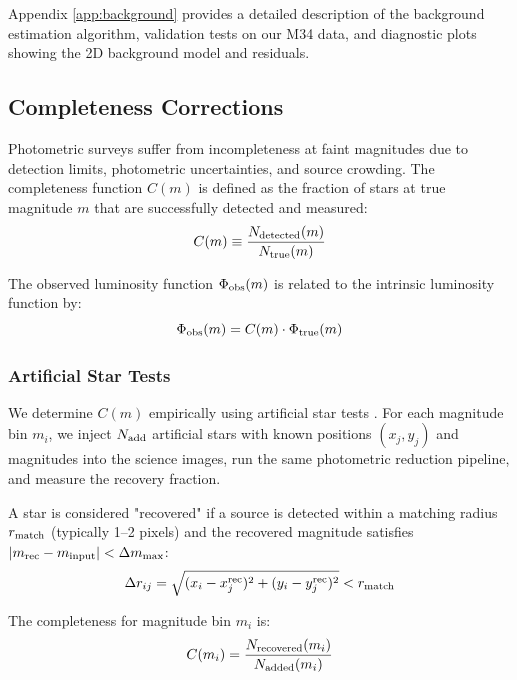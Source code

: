 \documentclass[linenumbers,trackchanges,twocolumn]{aastex701}
\begin{document}
Appendix \ref{app:background} provides a detailed description of the background estimation algorithm, validation tests on our M34 data, and diagnostic plots showing the 2D background model and residuals.

\subsection{Completeness Corrections} \label{subsec:completeness}

Photometric surveys suffer from incompleteness at faint magnitudes due to detection limits, photometric uncertainties, and source crowding. The completeness function $C(m)$ is defined as the fraction of stars at true magnitude $m$ that are successfully detected and measured:
\begin{equation}
C(m) \equiv \frac{N_{\rm detected}(m)}{N_{\rm true}(m)}
\end{equation}

The observed luminosity function $\Phi_{\rm obs}(m)$ is related to the intrinsic luminosity function by:
\begin{equation}
\Phi_{\rm obs}(m) = C(m) \cdot \Phi_{\rm true}(m)
\label{eq:lf_completeness}
\end{equation}

\subsubsection{Artificial Star Tests}

We determine $C(m)$ empirically using artificial star tests \citep{stetson1990}. For each magnitude bin $m_i$, we inject $N_{\rm add}$ artificial stars with known positions $(x_j, y_j)$ and magnitudes into the science images, run the same photometric reduction pipeline, and measure the recovery fraction.

A star is considered "recovered" if a source is detected within a matching radius $r_{\rm match}$ (typically 1--2 pixels) and the recovered magnitude satisfies $|m_{\rm rec} - m_{\rm input}| < \Delta m_{\rm max}$:
\begin{equation}
\Delta r_{ij} = \sqrt{(x_i - x_j^{\rm rec})^2 + (y_i - y_j^{\rm rec})^2} < r_{\rm match}
\end{equation}

The completeness for magnitude bin $m_i$ is:
\begin{equation}
C(m_i) = \frac{N_{\rm recovered}(m_i)}{N_{\rm added}(m_i)}
\end{equation}
\end{document}
